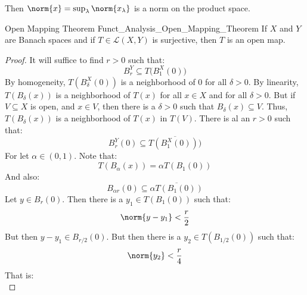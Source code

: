         Then $\norm{x}=\sup_{\lambda}\norm{x_{\lambda}}$ is a norm
        on the product space.
        \begin{ltheorem}{Open Mapping Theorem}
              {Funct_Analysis_Open_Mapping_Theorem}
            If $X$ and $Y$ are Banach spaces and if
            $T\in\mathcal{L}(X,Y)$ is surjective, then $T$ is an
            open map.
        \end{ltheorem}
        \begin{proof}
            It will suffice to find $r>0$ such that:
            \begin{equation}
                B_{r}^{Y}\subseteq
                T\Big(B_{1}^{X}(0)\Big)
            \end{equation}
            By homogeneity, $T(B_{\delta}^{X}(0))$ is a
            neighborhood of $0$ for all $\delta>0$. By linearity,
            $T(B_{\delta}(x))$ is a neighborhood of
            $T(x)$ for all $x\in{X}$ and for all $\delta>0$. But
            if $V\subseteq{X}$ is open, and $x\in{V}$, then there
            is a $\delta>0$ such that $B_{\delta}(x)\subseteq{V}$.
            Thus, $T(B_{\delta}(x))$ is a neighborhood of $T(x)$
            in $T(V)$. There is al an $r>0$ such that:
            \begin{equation}
                B_{r}^{Y}(0)\subseteq
                \overline{T(B_{1}^{X}(0)))}
            \end{equation}
            For let $\alpha\in(0,1)$. Note that:
            \begin{equation}
                T(B_{\alpha}(x))=\alpha{T}(B_{1}(0))
            \end{equation}
            And also:
            \begin{equation}
                B_{\alpha{r}}(0)\subseteq
                \overline{\alpha{T}(B_{1}(0))}
            \end{equation}
            Let $y\in{B}_{r}(0)$. Then there is a
            $y_{1}\in{T(B_{1}(0))}$ such that:
            \begin{equation}
                \norm{y-y_{1}}<\frac{r}{2}
            \end{equation}
            But then $y-y_{1}\in{B}_{r/2}(0)$. But then there is a
            $y_{2}\in{T}(B_{1/2}(0))$ such that:
            \begin{equation}
                \norm{y_{2}}<\frac{r}{4}
            \end{equation}
            That is:
            \begin{equation}

\end{equation}
\end{proof}
